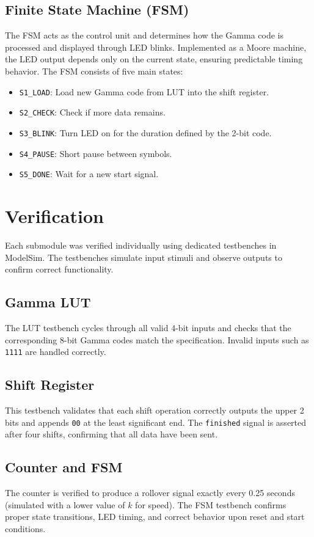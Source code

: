 \documentclass[conference]{IEEEtran}
\begin{document}
\subsection{Finite State Machine (FSM)}
The FSM acts as the control unit and determines how the Gamma code is processed and displayed through LED blinks. Implemented as a Moore machine, the LED output depends only on the current state, ensuring predictable timing behavior. The FSM consists of five main states:
\begin{itemize}
  \item \texttt{S1\_LOAD}: Load new Gamma code from LUT into the shift register.
  \item \texttt{S2\_CHECK}: Check if more data remains.
  \item \texttt{S3\_BLINK}: Turn LED on for the duration defined by the 2-bit code.
  \item \texttt{S4\_PAUSE}: Short pause between symbols.
  \item \texttt{S5\_DONE}: Wait for a new start signal.
\end{itemize}

\section{Verification}
Each submodule was verified individually using dedicated testbenches in ModelSim. The testbenches simulate input stimuli and observe outputs to confirm correct functionality.

\subsection{Gamma LUT}
The LUT testbench cycles through all valid 4-bit inputs and checks that the corresponding 8-bit Gamma codes match the specification. Invalid inputs such as \texttt{1111} are handled correctly.

\subsection{Shift Register}
This testbench validates that each shift operation correctly outputs the upper 2 bits and appends \texttt{00} at the least significant end. The \texttt{finished} signal is asserted after four shifts, confirming that all data have been sent.

\subsection{Counter and FSM}
The counter is verified to produce a rollover signal exactly every 0.25 seconds (simulated with a lower value of $k$ for speed). The FSM testbench confirms proper state transitions, LED timing, and correct behavior upon reset and start conditions.
\end{document}
